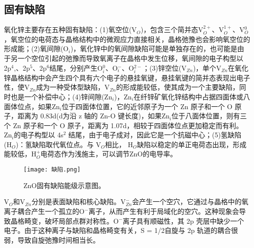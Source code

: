 \subsection{固有缺陷\cite{nadupalli2021defect}}
氧化锌主要存在五种固有缺陷：(1)氧空位(V$_O$)，包含三个简并态V$^{2+}_O$、V$^{1+}_O$、V$^{0}_O$，氧空位的电荷态与晶格结构中的微观应力直接相关，晶格弛豫也会影响氧空位的形成能；(2)氧间隙(O$_i$)，氧化锌中的氧间隙缺陷可能是单独存在的，也可能是由于另一个空位引起的弛豫而导致氧离子在晶格中发生位移，氧间隙的电子构型以2p$^4$,、2p$^5$、2p$^6$结尾，分别产生O$_i^0$、O$_i^−$、O$_i^{2-}$；(3)锌空位(V$_{Zn}$)，单个V$_{Zn}$在氧化锌晶格结构中会产生四个具有六个电子的悬挂氧键，悬挂氧键的简并态表现出电子性，使V$_{Zn}$成为一种受体型缺陷，V$_{Zn}$的形成能较低，使其成为一个主要缺陷，同时也是一个补偿中心；(4)锌间隙(Zn$_i$)，Zn$_i$在纤锌矿氧化锌结构中占据四面体或八面体位点，如果Zn$_i$位于四面体位置，它的近邻原子为一个 Zn 原子和一个 O 原子，距离为 0.83d(d为沿 z 轴的 Zn-O 键长度)，如果Zn$_i$位于八面体位置，则有三个 Zn 原子和一个 O 原子，距离为 1.07d，相较于四面体位点更加稳定而有利。Zn$_i$的电子构型以 4s$^2$  结尾，由于电子成对，因此它是一个抗磁中心；(5)氢缺陷 (H$_O$)：氢缺陷取代氧位点。与 V$_O$相比， H$_O$缺陷以稳定的单正电荷态出现，形成能较低，H$_O^+$电荷态作为浅施主，可以调节ZnO的电导率。

\begin{figure}[ht]
	\centering
	\texttt{[image: 缺陷.png]}
	\caption{ZnO固有缺陷能级示意图\cite{nadupalli2021defect}。}
	\label{fig:缺陷}
\end{figure}

V$_O$和V$_{Zn}$分别是表面缺陷和核心缺陷。V$_{Zn}^-$会产生一个空穴，它通过与晶格中的氧离子耦合产生一个孤立的O$^-$离子，从而产生有利于局域化的空穴。这种现象会导致晶格畸变，破坏局部点群对称性。O$^-$离子具有顺磁性，其 2p 壳层中缺少一个电子。由于这种离子与缺陷和晶格畸变有关，S = 1/2自旋与 2p 轨道的耦合很弱，导致自旋弛豫时间相当长。
